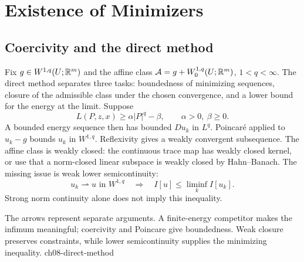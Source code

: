 \Needspace{55mm}
\section{Existence of Minimizers}
\label{sec:8-2}
\Needspace{45mm}
\subsection{Coercivity and the direct method}
Fix $g\in W^{1,q}(U;\mathbb{R}^m)$ and the affine class
$\mathcal A=g+W^{1,q}_0(U;\mathbb{R}^m)$, $1<q<\infty$.
The direct method separates three tasks: boundedness of minimizing
sequences, closure of the admissible class under the chosen convergence,
and a lower bound for the energy at the limit.
Suppose
\begin{equation}\label{eq:8-coercivity}
 L(P,z,x)\geq\alpha|P|^q-\beta,\qquad\alpha>0,\ \beta\geq0.
\end{equation}
A bounded energy sequence then has bounded $Du_k$ in $L^q$.
Poincar\'e applied to $u_k-g$ bounds $u_k$ in $W^{1,q}$.
Reflexivity gives a weakly convergent subsequence. The affine class is
weakly closed: the continuous trace map has weakly closed kernel, or use
that a norm-closed linear subspace is weakly closed by Hahn--Banach.
The missing issue is weak lower semicontinuity:
\[
 u_k\rightharpoonup u\text{ in }W^{1,q}
 \quad\Longrightarrow\quad I[u]\leq\liminf_kI[u_k].
\]
Strong norm continuity alone does not imply this inequality.
\Needspace{55mm}

{The arrows represent separate arguments. A finite-energy competitor makes the infimum meaningful; coercivity and Poincare give boundedness. Weak closure preserves constraints, while lower semicontinuity supplies the minimizing inequality.}
{ch08-direct-method}

\Needspace{45mm}
